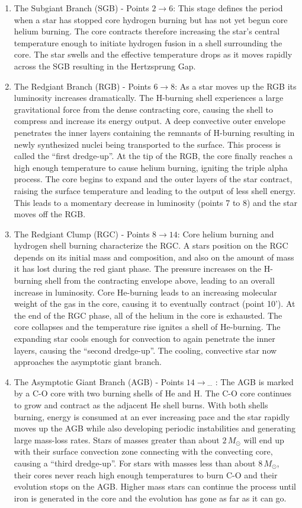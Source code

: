 \begin{enumerate}
%
\item The Subgiant Branch (SGB) - Points $2 \rightarrow 6$: This stage defines the period when a star has stopped core hydrogen burning but has not yet begun core helium burning. The core contracts therefore increasing the star's central temperature enough to initiate hydrogen fusion in a shell surrounding the core. The star swells and the effective temperature drops as it moves rapidly across the SGB resulting in the Hertzsprung Gap.
%
\item The Redgiant Branch (RGB) - Points $6 \rightarrow 8$: As a star moves up the RGB its luminosity increases dramatically. The H-burning shell experiences a large gravitational force from the dense contracting core, causing the shell to compress and increase its energy output. A deep convective outer envelope penetrates the inner layers containing the remnants of H-burning resulting in newly synthesized nuclei being transported to the surface. This process is called the ``first dredge-up''. At the tip of the RGB, the core finally reaches a high enough temperature to cause helium burning, igniting the triple alpha process. The core begins to expand and the outer layers of the star contract, raising the surface temperature and leading to the output of less shell energy. This leads to a momentary decrease in luminosity (points 7 to 8) and the star moves off the RGB.
%
\item The Redgiant Clump (RGC) - Points $8 \rightarrow 14$: Core helium burning and hydrogen shell burning characterize the RGC. A stars position on the RGC depends on its initial mass and composition, and  also on the amount of mass it has lost during the red giant phase. The pressure increases on the H-burning shell from the contracting envelope above, leading to an overall increase in luminosity. Core He-burning leads to an increasing molecular weight of the gas in the core, causing it to eventually contract (point 10'). At the end of the RGC phase, all of the helium in the core is exhausted. The core collapses and the temperature rise ignites a shell of He-burning. The expanding star cools enough for convection to again penetrate the inner layers, causing the ``second dredge-up''. The cooling, convective star  now approaches the asymptotic giant branch.
%
\item The Asymptotic Giant Branch  (AGB) - Points $14 \rightarrow {}_{\cdots}$ : The AGB is marked by a C-O core with two burning shells of He and H. The C-O core continues to grow and contract as the adjacent He shell burns. With both shells burning, energy is consumed at an ever increasing pace and the star rapidly moves up the AGB while also developing periodic instabilities and generating large mass-loss rates. Stars of masses greater than about $2\,M_{\odot}$ will end up with their surface convection zone connecting with the convecting core, causing a ``third dredge-up''. For stars with masses less than about $8\,M_{\odot}$, their cores never reach high enough temperatures to burn C-O and their evolution stops on the AGB. Higher mass stars can continue the process until iron is generated in the core and the evolution has gone as far as it can go.
\end{enumerate}
